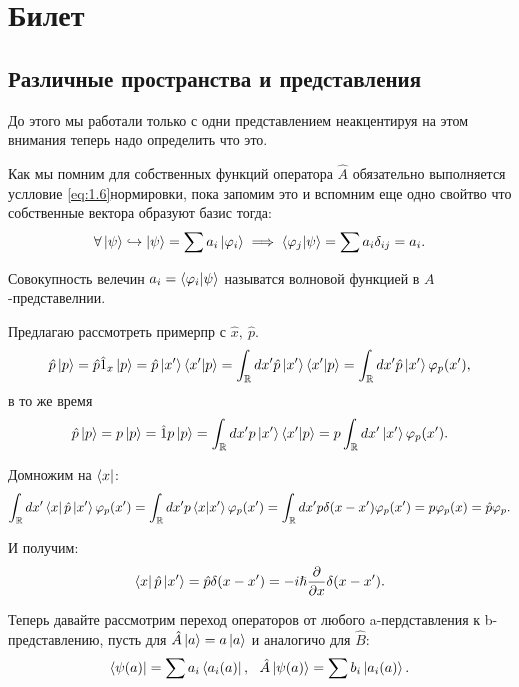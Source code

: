 \section{Билет}
\subsection{Различные пространства и представления}
\tab До этого мы работали только с одни представлением неакцентируя 
на этом внимания теперь надо определить что это.

Как мы помним для собственных функций оператора $\hat A$ обязательно 
выполняется услловие \ref{eq:1.6}{нормировки}, пока запомим 
это и вспомним еще одно свойтво что собственные вектора образуют 
базис тогда:
\begin{equation*} 
 \forall \ket{\psi} \hookrightarrow \ket{\psi} = \sum a_i \ket{\varphi_i} \implies 
 \braket{\varphi_j}{\psi} = \sum a_i \delta_{ij} = a_i.
\end{equation*}  

Совокупность велечин $a_i = \braket{\varphi_i}{\psi}$ называтся
волновой функцией в $A$-представелнии. 

Предлагаю рассмотреть примерпр с $\hat x, \ \hat p$. 
\begin{equation*} 
\hat p \ket{p} = \hat p \hat 1_x \ket{p} = 
\hat p \ket{x'} \braket{x'}{p} = 
\int_{\mathbb{R}} dx' \hat p \ket{x'}\braket{x'}{p} = 
\int_{\mathbb{R}} dx' \hat p \ket{x'} \varphi_p(x'),
\end{equation*}
в то же время  
\begin{equation*} 
\hat p \ket{p} = p \ket{p} = \hat 1 p \ket{p} = 
\int_{\mathbb{R}} dx' p \ket{x'} \braket{x'}{p} = 
p \int_{\mathbb{R}} dx' \ket{x'} \varphi_p(x').
\end{equation*} 

Домножим на $\bra{x}$:
\begin{equation*} 
\int_{\mathbb{R}}dx'\bra{x} \hat p \ket{x'} \varphi_p(x') = 
\int_{\mathbb{R}}dx' p \braket{x}{x'} \varphi_p(x') =
\int_{\mathbb{R}}dx' p \delta(x - x') \varphi_p(x') = 
p \varphi_p(x) = \hat p \varphi_p.
\end{equation*} 

И получим:
\begin{equation} 
\bra{x} \hat p \ket{x'} = \hat p \delta(x - x') = 
- i \hslash \frac{\partial }{\partial x} \delta(x - x').
\end{equation}

Теперь давайте рассмотрим переход операторов от любого 
a-пердставления к b-представлению, пусть для 
$\hat A \ket{a} = a \ket{a}$ и аналогичо для $\hat B$:
\begin{equation*} 
  \bra{\psi(a)} = \sum a_i \bra{a_i(a)}, \ \ 
  \hat A \ket{\psi(a)} = \sum b_i \ket{a_i(a)}.
\end{equation*} 


